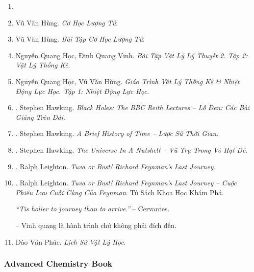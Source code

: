 \documentclass{article}
\begin{document}
\begin{enumerate}
\begin{quotation}
		***	
	\end{quotation}
	\item 
	\item Vũ Văn Hùng. {\it Cơ Học Lượng Tử}.
	\item Vũ Văn Hùng. {\it Bài Tập Cơ Học Lượng Tử}.
	\item Nguyễn Quang Học, Đinh Quang Vinh. {\it Bài Tập Vật Lý Lý Thuyết 2. Tập 2: Vật Lý Thống Kê}.
	\item Nguyễn Quang Học, Vũ Văn Hùng. {\it Giáo Trình Vật Lý Thống Kê \& Nhiệt Động Lực Học. Tập 1: Nhiệt Động Lực Học}.
	\item \cite{Hawking_bbc}. Stephen Hawking. {\it Black Holes: The BBC Reith Lectures -- Lỗ Đen: Các Bài Giảng Trên Đài}.\hfill{\sf[done]}
	\item \cite{Hawking_lstg}. Stephen Hawking. {\it A Brief History of Time -- Lược Sử Thời Gian}.\hfill{\sf[done]}
	\item \cite{Hawking_vttvhd}. Stephen Hawking. {\it The Universe In A Nutshell -- Vũ Trụ Trong Vỏ Hạt Dẻ}.\hfill{\sf[done]}
	\item \cite{Leighton_Feyman_last_journey}. {\sc Ralph Leighton}. {\it Tuva or Bust! Richard Feynman's Last Journey}.
	\item \cite{Leighton_Feyman_last_journey_VN}. {\sc Ralph Leighton}. {\it Tuva or Bust! Richard Feynman's Last Journey -- Cuộc Phiêu Lưu Cuối Cùng Của Feynman}. Tủ Sách Khoa Học Khám Phá.\hfill{\sf[done]}
	
	{\it``Tis holier to journey than to arrive.''} -- {\sc Cervantes.}
	
	-- Vinh quang là hành trình chứ không phải đích đến. \cite[Suy ngẫm 2000, p. 269]{Leighton_Feyman_last_journey_VN}
	\item Đào Văn Phúc. {\it Lịch Sử Vật Lý Học}.
\end{enumerate}


\subsubsection{Advanced Chemistry Book}
\end{document}

